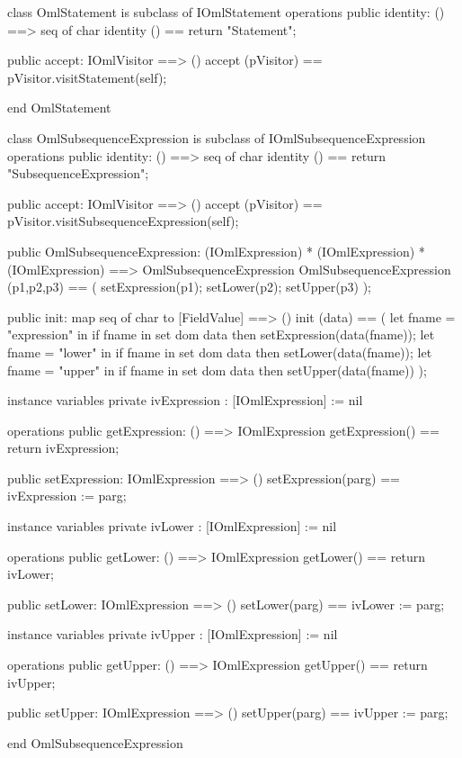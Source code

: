 \begin{vdm_al}
class OmlStatement is subclass of IOmlStatement
operations
  public identity: () ==> seq of char
  identity () == return "Statement";

  public accept: IOmlVisitor ==> ()
  accept (pVisitor) == pVisitor.visitStatement(self);

end OmlStatement
\end{vdm_al}
\begin{vdm_al}
class OmlSubsequenceExpression is subclass of IOmlSubsequenceExpression
operations
  public identity: () ==> seq of char
  identity () == return "SubsequenceExpression";

  public accept: IOmlVisitor ==> ()
  accept (pVisitor) == pVisitor.visitSubsequenceExpression(self);

  public OmlSubsequenceExpression:
      (IOmlExpression) *
      (IOmlExpression) *
      (IOmlExpression) ==> OmlSubsequenceExpression
  OmlSubsequenceExpression (p1,p2,p3) == 
   ( setExpression(p1);
     setLower(p2);
     setUpper(p3) );

  public init: map seq of char to [FieldValue] ==> ()
  init (data) ==
    ( let fname = "expression" in
        if fname in set dom data
        then setExpression(data(fname));
      let fname = "lower" in
        if fname in set dom data
        then setLower(data(fname));
      let fname = "upper" in
        if fname in set dom data
        then setUpper(data(fname)) );

instance variables
  private ivExpression : [IOmlExpression] := nil

operations
  public getExpression: () ==> IOmlExpression
  getExpression() == return ivExpression;

  public setExpression: IOmlExpression ==> ()
  setExpression(parg) == ivExpression := parg;

instance variables
  private ivLower : [IOmlExpression] := nil

operations
  public getLower: () ==> IOmlExpression
  getLower() == return ivLower;

  public setLower: IOmlExpression ==> ()
  setLower(parg) == ivLower := parg;

instance variables
  private ivUpper : [IOmlExpression] := nil

operations
  public getUpper: () ==> IOmlExpression
  getUpper() == return ivUpper;

  public setUpper: IOmlExpression ==> ()
  setUpper(parg) == ivUpper := parg;

end OmlSubsequenceExpression
\end{vdm_al}

